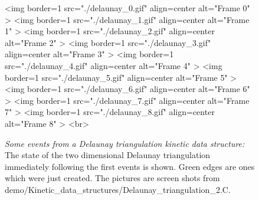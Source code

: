 \begin{figure}[htb]
\begin{ccHtmlOnly}

<img border=1 src="./delaunay_0.gif" align=center alt="Frame 0" >
<img border=1 src="./delaunay_1.gif" align=center alt="Frame 1" >
<img border=1 src="./delaunay_2.gif" align=center alt="Frame 2" >
<img border=1 src="./delaunay_3.gif" align=center alt="Frame 3" >
<img border=1 src="./delaunay_4.gif" align=center alt="Frame 4" >
<img border=1 src="./delaunay_5.gif" align=center alt="Frame 5" >
<img border=1 src="./delaunay_6.gif" align=center alt="Frame 6" >
<img border=1 src="./delaunay_7.gif" align=center alt="Frame 7" >
<img border=1 src="./delaunay_8.gif" align=center alt="Frame 8" >
<br>
\end{ccHtmlOnly}
\caption{ \label{fig:delaunay_events} 
{\em Some events from a Delaunay triangulation kinetic data
structure:} The state of the two dimensional Delaunay triangulation
immediately following the first events is shown. Green edges are ones
which were just created. The pictures are screen shots from
demo/Kinetic\_data\_structures/Delaunay\_triangulation\_2.C. }
\end{figure}


